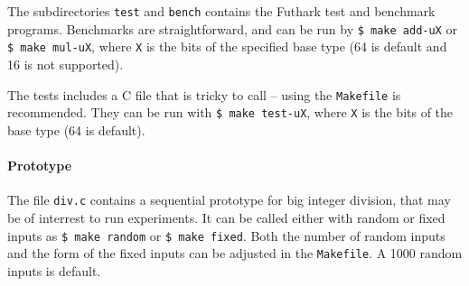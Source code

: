 The subdirectories \texttt{test} and \texttt{bench} contains the Futhark test
and benchmark programs. Benchmarks are straightforward, and can be run by
\texttt{\$ make add-uX} or \texttt{\$ make mul-uX}, where \texttt{X} is the bits
of the specified base type (64 is default and 16 is not supported).

The tests includes a C file that is tricky to call -- using the \texttt{Makefile}
is recommended. They can be run with \texttt{\$ make test-uX}, where \texttt{X}
is the bits of the base type (64 is default).

\paragraph{Prototype}
The file \texttt{div.c} contains a sequential prototype for big integer
division, that may be of interrest to run experiments. It can be called either
with random or fixed inputs as \texttt{\$ make random} or \texttt{\$ make
  fixed}. Both the number of random inputs and the form of the fixed inputs can
be adjusted in the \texttt{Makefile}. A 1000 random inputs is default.

